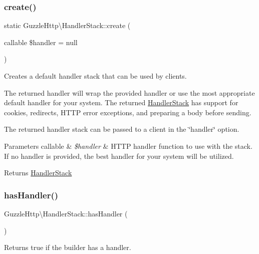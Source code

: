 \subsubsection{\texorpdfstring{create()}{create()}}
{\footnotesize\ttfamily static Guzzle\+Http\textbackslash{}\+Handler\+Stack\+::create (\begin{DoxyParamCaption}\item[{callable}]{\$handler = {\ttfamily null} }\end{DoxyParamCaption})\hspace{0.3cm}{\ttfamily [static]}}

Creates a default handler stack that can be used by clients.

The returned handler will wrap the provided handler or use the most appropriate default handler for your system. The returned \hyperlink{classGuzzleHttp_1_1HandlerStack}{Handler\+Stack} has support for cookies, redirects, H\+T\+TP error exceptions, and preparing a body before sending.

The returned handler stack can be passed to a client in the \char`\"{}handler\char`\"{} option.


\begin{DoxyParams}[1]{Parameters}
callable & {\em \$handler} & H\+T\+TP handler function to use with the stack. If no handler is provided, the best handler for your system will be utilized.\\
\hline
\end{DoxyParams}
\begin{DoxyReturn}{Returns}
\hyperlink{classGuzzleHttp_1_1HandlerStack}{Handler\+Stack} 
\end{DoxyReturn}
\mbox{\label{classGuzzleHttp_1_1HandlerStack_ae0f44f5088fb05b053a56fe84f264637}} 
\subsubsection{\texorpdfstring{has\+Handler()}{hasHandler()}}
{\footnotesize\ttfamily Guzzle\+Http\textbackslash{}\+Handler\+Stack\+::has\+Handler (\begin{DoxyParamCaption}{ }\end{DoxyParamCaption})}

Returns true if the builder has a handler.

